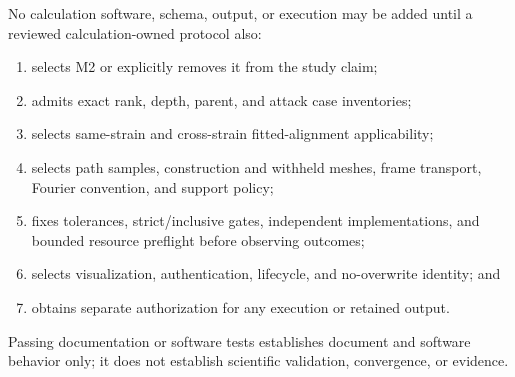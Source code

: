 \documentclass[11pt]{article}
\begin{document}
No calculation software, schema, output, or execution may be added until a reviewed
calculation-owned protocol also:
\begin{enumerate}[leftmargin=*]
  \item selects M2 or explicitly removes it from the study claim;
  \item admits exact rank, depth, parent, and attack case inventories;
  \item selects same-strain and cross-strain fitted-alignment applicability;
  \item selects path samples, construction and withheld meshes, frame transport,
    Fourier convention, and support policy;
  \item fixes tolerances, strict/inclusive gates, independent implementations, and
    bounded resource preflight before observing outcomes;
  \item selects visualization, authentication, lifecycle, and no-overwrite identity;
    and
  \item obtains separate authorization for any execution or retained output.
\end{enumerate}
Passing documentation or software tests establishes document and software behavior only;
it does not establish scientific validation, convergence, or evidence.
\end{document}
